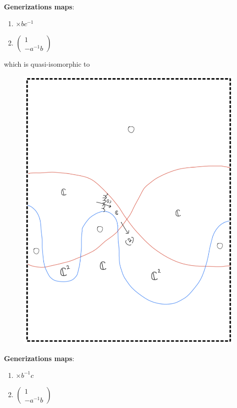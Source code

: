 \begin{enumerate}[label=(Step \arabic*)]
\textbf{Generizations maps}:
\begin{enumerate}[label = (\arabic*)]
\item $\times bc^{-1}$
\item 
$\begin{pmatrix}
1\\
-a^{-1}b
\end{pmatrix}$
\end{enumerate}
which is quasi-isomorphic to
\begin{figure}[H]
    \centering
    \includegraphics[scale = 0.95]{diagrams/cobord8/9.png}
    \caption{}
    \label{fig:your-label}
\end{figure}
\textbf{Generizations maps}:
\begin{enumerate}[label = (\arabic*)]
\item $\times b^{-1}c$
\item 
$\begin{pmatrix}
1\\
-a^{-1}b
\end{pmatrix}$
\end{enumerate}


\end{enumerate}
